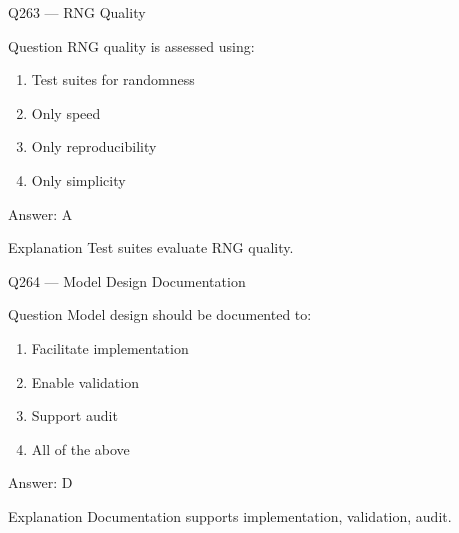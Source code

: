 \documentclass[aspectratio=169,8pt]{beamer}
\begin{document}
								\begin{frame}{Q263 --- RNG Quality}
									\begin{block}{Question}
										RNG quality is assessed using:
										\begin{enumerate}
											\item Test suites for randomness
											\item Only speed
											\item Only reproducibility
											\item Only simplicity
										\end{enumerate}
									\end{block}
									\begin{exampleblock}{Answer: A}\end{exampleblock}
									\begin{block}{Explanation}
										Test suites evaluate RNG quality.
									\end{block}
								\end{frame}
								
								\begin{frame}{Q264 --- Model Design Documentation}
									\begin{block}{Question}
										Model design should be documented to:
										\begin{enumerate}
											\item Facilitate implementation
											\item Enable validation
											\item Support audit
											\item All of the above
										\end{enumerate}
									\end{block}
									\begin{exampleblock}{Answer: D}\end{exampleblock}
									\begin{block}{Explanation}
										Documentation supports implementation, validation, audit.
									\end{block}
								\end{frame}
								
\end{document}
